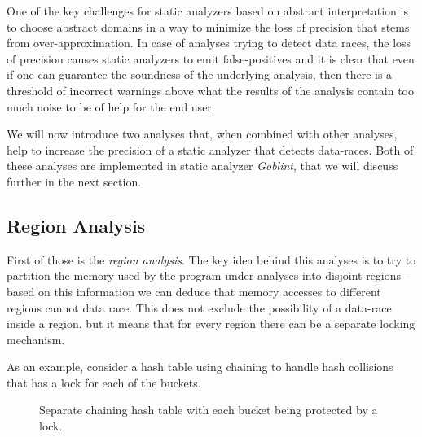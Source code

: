 \documentclass[..thesis.tex]{subfiles}
\begin{document}
One of the key challenges for static analyzers based on abstract interpretation is to choose abstract domains in a way to minimize the loss
of precision that stems from over-approximation.
In case of analyses trying to detect data races, the loss of precision causes static analyzers to emit false-positives and it is clear
that even if one can guarantee the soundness of the underlying analysis,
then there is a threshold of incorrect warnings above what the results of the analysis contain too much noise to be of help for the end user.

We will now introduce two analyses that, when combined with other analyses, help to increase the precision of a static analyzer that detects data-races.
Both of these analyses are implemented in static analyzer \textit{Goblint}, that we will discuss further in the next section.


\subsection{Region Analysis}

First of those is the \textit{region analysis}. The key idea behind this analyses is to try to partition the memory used by the program under analyses into disjoint regions --
based on this information we can deduce that memory accesses to different regions cannot data race.
This does not exclude the possibility of a data-race inside a region, but it means that for every region there can be a separate locking mechanism.

As an example, consider a hash table using chaining to handle hash collisions that has a lock for each of the buckets.


\begin{figure}[H]
  \centering
  \caption{Separate chaining hash table with each bucket being protected by a lock.} 
\end{figure}
\end{document}
